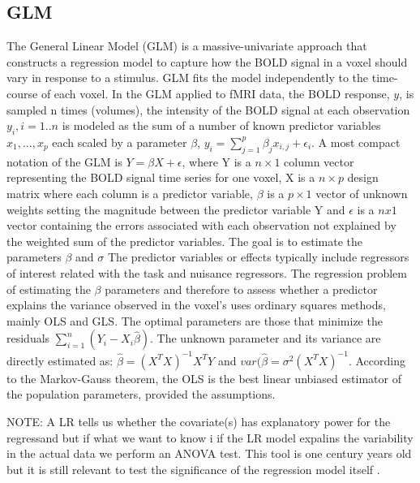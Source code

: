 \documentclass[10pt,letterpaper]{article}
\begin{document}
\subsection*{GLM}
The General Linear Model (GLM) is a massive-univariate approach that constructs a regression model to capture how the BOLD signal in a voxel should vary in response to a stimulus. 
GLM fits the model independently to the time-course of each voxel.
In the GLM applied to fMRI data, the BOLD response, $y$, is sampled n times (volumes), the intensity of the BOLD signal at each observation $y_i, i =1..n$ is modeled as the sum of a number of known predictor variables $x_1,...,x_p$ each scaled by a parameter $\beta$, $y_i = \sum_{j=1}^{p} \beta_j x_{i,j} + \epsilon_i$. 
A most compact notation of the GLM is $Y = \beta X + \epsilon$, where Y is a $n \times 1$ column vector representing the BOLD signal time series for one voxel, X is a $n \times p$ design matrix where each column is a predictor variable, $\beta$ is a $p \times 1$ vector of unknown weights setting the magnitude between the predictor variable Y and $\epsilon$ is a $n x 1$ vector containing the errors associated with each observation not explained by the weighted sum of the predictor variables. 
The goal is to estimate the parameters $\beta$ and $\sigma$ The predictor variables or effects typically include regressors of interest related with the task and nuisance regressors. 
The regression problem of estimating the $\beta$ parameters and therefore to assess whether a predictor explains the variance observed in the voxel's uses ordinary squares methods, mainly OLS and GLS. The optimal parameters are those that minimize the residuals $\sum_{i=1}^{n}(Y_i - X_i \hat{\beta})$. The unknown parameter and its variance are directly estimated as: $\hat{\beta} = (X^T X)^{-1}X^T Y$ and $var(\hat{\beta} = \sigma^2(X^T X)^{-1}$.
According to the Markov-Gauss theorem, the OLS is the best linear unbiased estimator of the population parameters, provided the assumptions. 

NOTE: A LR tells us whether the covariate(s) has explanatory power for the regressand but if what we want to know i if the LR model expalins the variability in the actual data we perform an ANOVA test. This tool is one century years old but it is still relevant to test the significance of the regression model itself \citep{gelman2005analysis}.
\end{document}
